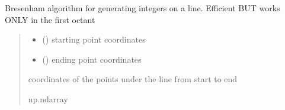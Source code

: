 \documentclass[letterpaper,10pt,english]{sphinxmanual}
\begin{document}
\begin{fulllineitems}
\label{\detokenize{micropolarray.processing:micropolarray.processing.linear_roi.bresenham}}
\pysigstartsignatures
{}
\pysigstopsignatures
\sphinxAtStartPar
Bresenham algorithm for generating integers on a line.
Efficient BUT works ONLY in the first octant
\begin{quote}\begin{description}
\begin{itemize}
\item {} 
\sphinxAtStartPar
{} () \textendash{} starting point coordinates

\item {} 
\sphinxAtStartPar
{} () \textendash{} ending point coordinates

\end{itemize}

\sphinxAtStartPar
coordinates of the points under the line from
start to end

\sphinxAtStartPar
np.ndarray

\end{description}\end{quote}

\end{fulllineitems}

\end{document}
